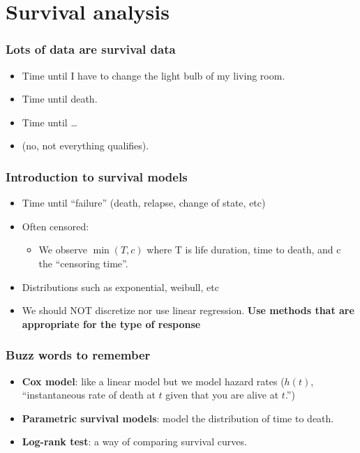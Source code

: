 \section[Survival]{Survival analysis}

\begin{frame}
  \frametitle{Lots of data are survival data}
  \begin{itemize}
  \item Time until I have to change the light bulb of my living room.
  \item Time until death.
  \item Time until \ldots
  \item (no, not everything qualifies).
  \end{itemize}
\end{frame}



\begin{frame}
\frametitle{Introduction to survival models}
\begin{itemize}
\item Time until ``failure'' (death, relapse, change of state, etc)
\item Often censored:
  \begin{itemize}
  \item We observe $\min(T, c)$  where T is life duration, time to death, and
  c the ``censoring time''.
  \end{itemize}
\item Distributions such as exponential, weibull, etc
\item We should NOT discretize nor use linear regression. \textbf{Use
    methods that are appropriate for the type of response}
\end{itemize}
\end{frame}



\begin{frame}
  \frametitle{Buzz words to remember}
  \begin{itemize}
  \item \textbf{Cox model}: like a linear model but we model hazard rates ($h(t)$,
    ``instantaneous rate of death at $t$ given that you are alive at $t$.'')
  \item \textbf{Parametric survival models}: model the distribution of
    time to death.
  \item \textbf{Log-rank test}: a way of comparing survival curves. 
  \end{itemize}
\end{frame}




